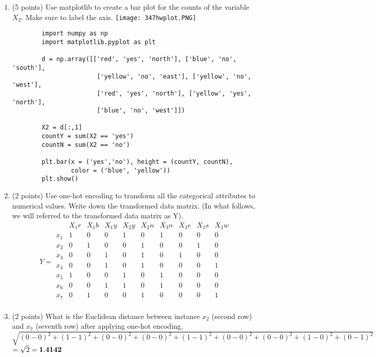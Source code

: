 \documentclass[11pt]{article}
\begin{document}
\begin{enumerate}
    \item (5 points) Use matplotlib to create a bar plot for the counts of the
    variable $X_2$.  Make sure to label the axis.
    \newline \texttt{[image: 347hwplot.PNG]}
    \newline
    \newline \begin{lstlisting}
        import numpy as np
        import matplotlib.pyplot as plt
        
        d = np.array([['red', 'yes', 'north'], ['blue', 'no', 'south'],
                       ['yellow', 'no', 'east'], ['yellow', 'no', 'west'],
                       ['red', 'yes', 'north'], ['yellow', 'yes', 'north'],
                       ['blue', 'no', 'west']])
        
        X2 = d[:,1]
        countY = sum(X2 == 'yes')
        countN = sum(X2 == 'no')
        
        plt.bar(x = ('yes','no'), height = (countY, countN), 
                color = ('blue', 'yellow'))
        plt.show()

    \end{lstlisting}
    \item (2 points) Use one-hot encoding to transform all the categorical
    attributes to numerical values.  Write down the transformed data matrix. (In
    what follows, we will referred to the transformed data matrix as Y).
    \newline $$
    Y = \begin{matrix}
            & X_1r & X_1b & X_1y & X_2y & X_2n & X_3n & X_3e & X_3s & X_3w\\
        x_1 & 1   & 0    & 0    & 1     & 0   & 1    & 0    & 0    & 0\\
        x_2 & 0   & 1    & 0    & 0     & 1   & 0    & 0    & 1    & 0\\
        x_3 & 0   & 0    & 1    & 0     & 1   & 0    & 1    & 0    & 0\\
        x_4 & 0   & 0    & 1    & 0     & 1   & 0    & 0    & 0    & 1\\
        x_5 & 1   & 0    & 0    & 1     & 0   & 1    & 0    & 0    & 0\\
        x_6 & 0   & 0    & 1    & 1     & 0   & 1    & 0    & 0    & 0\\
        x_7 & 0   & 1    & 0    & 0     & 1   & 0    & 0    & 0    & 1\\
    \end{matrix}
$$
    \newline
    \item (2 points) What is the Euclidean distance between instance $x_2$
    (second row) and $x_7$ (seventh row) after applying one-hot encoding.
    \newline $\sqrt{(0-0)^2+(1-1)^2+(0-0)^2+(0-0)^2+(1-1)^2+(0-0)^2+(0-0)^2+(1-0)^2+(0-1)^2}$
    \newline $= \sqrt{2} = \bf1.4142$


\end{enumerate}
\end{document}
